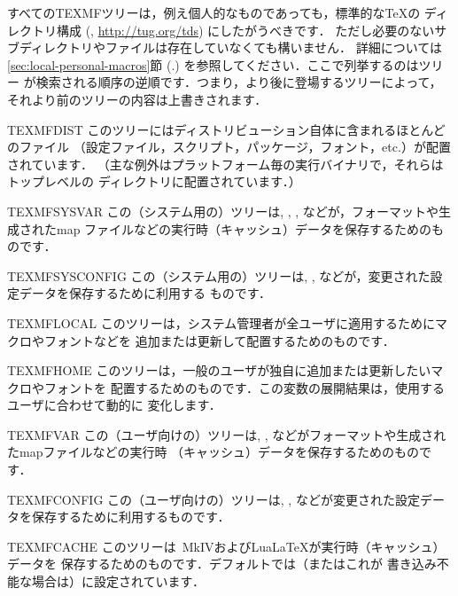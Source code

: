 \documentclass[uplatex,dvipdfmx]{jsarticle}
\begin{document}
すべてのTEXMFツリーは，例え個人的なものであっても，標準的な\TeX の
ディレクトリ構成 (\TDS, \url{http://tug.org/tds}) にしたがうべきです．
ただし必要のないサブディレクトリやファイルは存在していなくても構いません．
詳細については\ref{sec:local-personal-macros}節 (\p.\pageref{%
sec:local-personal-macros}) を参照してください．ここで列挙するのはツリー
が検索される順序の逆順です．つまり，より後に登場するツリーによって，
それより前のツリーの内容は上書きされます．
%
\begin{ttdescription}
\item[TEXMFDIST]
このツリーには\TL ディストリビューション自体に含まれるほとんどのファイル
（設定ファイル，スクリプト，パッケージ，フォント，etc.）が配置されています．
（主な例外はプラットフォーム毎の実行バイナリで，それらはトップレベルの
ディレクトリに配置されています．）

\item[TEXMFSYSVAR]
この（システム用の）ツリーは, ,
, などが，フォーマットや生成されたmap%
ファイルなどの実行時（キャッシュ）データを保存するためのものです．

\item[TEXMFSYSCONFIG]
この（システム用の）ツリーは, ,
などが，変更された設定データを保存するために利用する
ものです．

\item[TEXMFLOCAL]
このツリーは，システム管理者が全ユーザに適用するためにマクロやフォントなどを
追加または更新して配置するためのものです．

\item[TEXMFHOME]
このツリーは，一般のユーザが独自に追加または更新したいマクロやフォントを
配置するためのものです．この変数の展開結果は，使用するユーザに合わせて動的に
変化します．

\item[TEXMFVAR]
この（ユーザ向けの）ツリーは, ,
などがフォーマットや生成されたmapファイルなどの実行時
（キャッシュ）データを保存するためのものです．

\item[TEXMFCONFIG]
この（ユーザ向けの）ツリーは, ,
などが変更された設定データを保存するために利用するものです．

\item[TEXMFCACHE]
このツリーは\ConTeXt\ MkIVおよびLua\LaTeX が実行時（キャッシュ）データを
保存するためのものです．デフォルトでは（またはこれが
書き込み不能な場合は）に設定されています．
\end{ttdescription}
\end{document}
